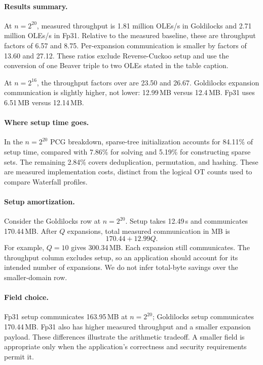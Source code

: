 \paragraph{Results summary.}
At $n=2^{20}$, measured throughput is 1.81 million OLEs/s in Goldilocks
and 2.71 million OLEs/s in Fp31. Relative to the measured
\cite{mp-spdz} baseline, these are throughput factors of 6.57 and 8.75.
Per-expansion communication is smaller by factors of 13.60 and 27.12.
These ratios exclude Reverse-Cuckoo setup and use the conversion of one
Beaver triple to two OLEs stated in the table caption.

At $n=2^{16}$, the throughput factors over \SumDmpf are 23.50 and 26.67.
Goldilocks expansion communication is slightly higher, not lower:
12.99\,MB versus 12.4\,MB. Fp31 uses 6.51\,MB versus 12.14\,MB.

\paragraph{Where setup time goes.}
In the $n=2^{20}$ PCG breakdown, sparse-tree initialization accounts for
84.11\% of setup time, compared with 7.86\% for solving and 5.19\% for
constructing sparse sets. The remaining 2.84\% covers deduplication,
permutation, and hashing. These are measured implementation costs, distinct
from the logical OT counts used to compare Waterfall profiles.

\paragraph{Setup amortization.}
Consider the Goldilocks row at $n=2^{20}$.
Setup takes 12.49\,s and communicates 170.44\,MB. After $Q$ expansions, total measured communication in MB is
\[
 170.44+12.99Q.
\]
For example, $Q=10$ gives 300.34\,MB.
Each expansion still communicates. The throughput column excludes setup,
so an application should account for its intended number of expansions.
We do not infer total-byte savings over the smaller-domain \SumDmpf row.

\paragraph{Field choice.}
Fp31 setup communicates 163.95\,MB at $n=2^{20}$;
Goldilocks setup communicates 170.44\,MB.
Fp31 also has higher measured throughput and a smaller expansion payload.
These differences illustrate the arithmetic tradeoff. A smaller field is
appropriate only when the application's correctness and security requirements
permit it.



